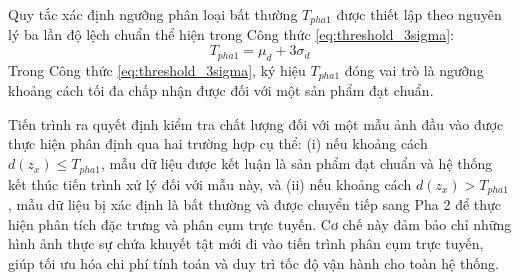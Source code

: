 Quy tắc xác định ngưỡng phân loại bất thường $T_{pha1}$ được thiết lập theo nguyên lý ba lần độ lệch chuẩn thể hiện trong Công thức \ref{eq:threshold_3sigma}:
\begin{equation}
\label{eq:threshold_3sigma}
T_{pha1} = \mu_d + 3 \sigma_d
\end{equation}
Trong Công thức \ref{eq:threshold_3sigma}, ký hiệu $T_{pha1}$ đóng vai trò là ngưỡng khoảng cách tối đa chấp nhận được đối với một sản phẩm đạt chuẩn.

Tiến trình ra quyết định kiểm tra chất lượng đối với một mẫu ảnh đầu vào được thực hiện phân định qua hai trường hợp cụ thể: (i) nếu khoảng cách $d(z_x) \le T_{pha1}$, mẫu dữ liệu được kết luận là sản phẩm đạt chuẩn và hệ thống kết thúc tiến trình xử lý đối với mẫu này, và (ii) nếu khoảng cách $d(z_x) > T_{pha1}$, mẫu dữ liệu bị xác định là bất thường và được chuyển tiếp sang Pha 2 để thực hiện phân tích đặc trưng và phân cụm trực tuyến. Cơ chế này đảm bảo chỉ những hình ảnh thực sự chứa khuyết tật mới đi vào tiến trình phân cụm trực tuyến, giúp tối ưu hóa chi phí tính toán và duy trì tốc độ vận hành cho toàn hệ thống.